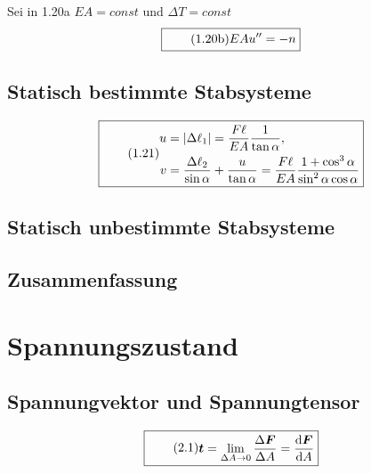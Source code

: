 \documentclass[11pt]{article}
\newcommand{\1}{ {\mathds{1}} }
\newcommand{\abs}[1]{\lvert#1\rvert}
\begin{document}
\begin{multicols}{2}
		Sei in 1.20a $EA = const$ und $\Delta T = const$
		\begin{equation}
			\boxed{
				\tag{1.20b}
				\begin{split}
					EA u''
					=
					-n
				\end{split}
			}
		\end{equation}


		\subsection{Statisch bestimmte Stabsysteme}

		\begin{equation}
			\boxed{
				\tag{1.21}
				\begin{split}
					u
					&=
					\abs{\Delta\ell_1}
					=
					\frac{F\ell}{EA}
					\frac{1}{\tan{\alpha}}
					,\\
					v
					&=
					\frac{\Delta\ell_2}{\sin{\alpha}}
					+
					\frac{u}{\tan{\alpha}}
					=
					\frac{F\ell}{EA}
					\frac{1 + \cos^3\alpha}{\sin^2\alpha \cos \alpha}
				\end{split}
			}
		\end{equation}


		\subsection{Statisch unbestimmte Stabsysteme}

		\subsection{Zusammenfassung}
		
		\section{Spannungszustand}
		\subsection{Spannungvektor und Spannungtensor}

		\begin{equation}
			\boxed{
				\tag{2.1}
				\begin{split}
					\boldsymbol{t}
					=
					\lim_{\Delta A \rightarrow 0}
					\frac{\Delta \boldsymbol{F}}{\Delta A}
					=
					\frac{\text{d}\boldsymbol{F}}{\text{d}A}
				\end{split}
			}
		\end{equation}


\end{multicols}
\end{document}
